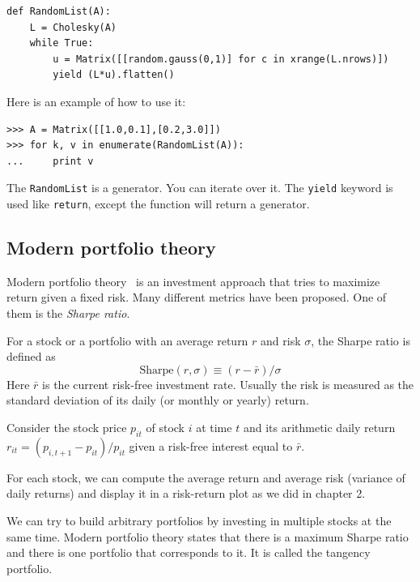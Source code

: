 \documentclass[justified,sixbynine]{tufte-book}
\def\ft{\small\tt}
\theoremstyle{plain}%
\theoremstyle{definition}
\theoremstyle{remark}
\begin{document}
\begin{fullwidth}
\begin{lstlisting}
def RandomList(A):
    L = Cholesky(A)
    while True:
        u = Matrix([[random.gauss(0,1)] for c in xrange(L.nrows)])
        yield (L*u).flatten()
\end{lstlisting}

Here is an example of how to use it:

\begin{lstlisting}
>>> A = Matrix([[1.0,0.1],[0.2,3.0]])
>>> for k, v in enumerate(RandomList(A)):
...     print v
\end{lstlisting}

The {\ft RandomList} is a generator. You can iterate over it. The {\ft yield} keyword is used like {\ft return}, except the function will return a generator.

\goodbreak\subsection{Modern portfolio theory}


Modern portfolio theory~\cite{mpt} is an investment approach that tries to maximize return given a fixed risk. Many different metrics have been proposed. One of them is the {\it Sharpe ratio}.

For a stock or a portfolio with an average return $r$ and risk $\sigma$, the Sharpe ratio is defined as
\begin{equation}
\textrm{Sharpe}(r,\sigma) \equiv (r-\bar r)/\sigma
\end{equation}
Here $\bar r$ is the current risk-free investment rate. Usually the risk is measured as the standard deviation of its daily (or monthly or yearly) return.

Consider the stock price $p_{it}$ of stock $i$ at time $t$ and its arithmetic daily return
$r_{it}=(p_{i,t+1}-p_{it})/p_{it}$ given a risk-free interest equal to $\bar r$.

For each stock, we can compute the average return and average risk (variance of daily returns) and display it in a risk-return plot as we did in chapter 2.

We can try to build arbitrary portfolios by investing in multiple stocks at the same time. Modern portfolio theory states that there is a maximum Sharpe ratio and there is one portfolio that corresponds to it. It is called the tangency portfolio.


\end{fullwidth}
\end{document}
